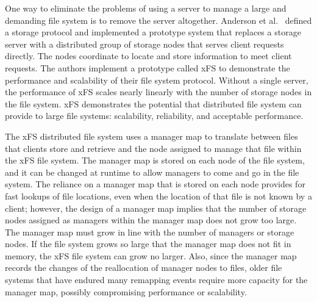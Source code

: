 One way to eliminate the problems of using a server to manage a large and demanding file system is to remove the server altogether.  Anderson et al.~\cite{ref1} defined a storage protocol and implemented a prototype system that replaces a storage server with a distributed group of storage nodes that serves client requests directly.  The nodes coordinate to locate and store information to meet client requests.  The authors implement a prototype called xFS to demonstrate the performance and scalability of their file system protocol.  Without a single server, the performance of xFS scales nearly linearly with the number of storage nodes in the file system.  xFS demonstrates the potential that distributed file system can provide to large file systems: scalability, reliability, and acceptable performance.

The xFS distributed file system uses a manager map to translate between files that clients store and retrieve and the node assigned to manage that file within the xFS file system.  The manager map is stored on each node of the file system, and it can be changed at runtime to allow managers to come and go in the file system.  The reliance on a manager map that is stored on each node provides for fast lookups of file locations, even when the location of that file is not known by a client; however, the design of a manager map implies that the number of storage nodes assigned as managers within the manager map does not grow too large.  The manager map must grow in line with the number of managers or storage nodes.  If the file system grows so large that the manager map does not fit in memory, the xFS file system can grow no larger.  Also, since the manager map records the changes of the reallocation of manager nodes to files, older file systems that have endured many remapping events require more capacity for the manager map, possibly compromising performance or scalability.

